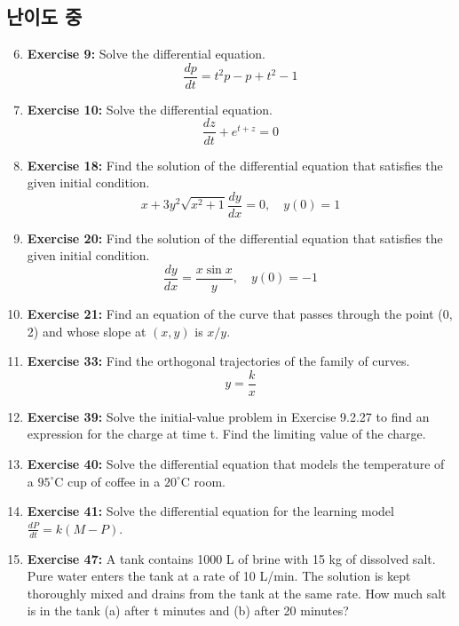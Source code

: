 \documentclass[12pt, a4paper]{article}
\begin{document}
\subsection*{난이도 중}
\begin{enumerate}
    \setcounter{enumi}{5} %
    \item \textbf{Exercise 9:} Solve the differential equation.
    \[ \frac{dp}{dt} = t^2p - p + t^2 - 1 \]

    \item \textbf{Exercise 10:} Solve the differential equation.
    \[ \frac{dz}{dt} + e^{t+z} = 0 \]

    \item \textbf{Exercise 18:} Find the solution of the differential equation that satisfies the given initial condition.
    \[ x + 3y^2\sqrt{x^2+1}\frac{dy}{dx} = 0, \quad y(0)=1 \]

    \item \textbf{Exercise 20:} Find the solution of the differential equation that satisfies the given initial condition.
    \[ \frac{dy}{dx} = \frac{x \sin x}{y}, \quad y(0)=-1 \]

    \item \textbf{Exercise 21:} Find an equation of the curve that passes through the point (0, 2) and whose slope at $(x,y)$ is $x/y$.

    \item \textbf{Exercise 33:} Find the orthogonal trajectories of the family of curves.
    \[ y = \frac{k}{x} \]

    \item \textbf{Exercise 39:} Solve the initial-value problem in Exercise 9.2.27 to find an expression for the charge at time t. Find the limiting value of the charge.

    \item \textbf{Exercise 40:} Solve the differential equation that models the temperature of a $95^{\circ}\text{C}$ cup of coffee in a $20^{\circ}\text{C}$ room.

    \item \textbf{Exercise 41:} Solve the differential equation for the learning model $\frac{dP}{dt}=k(M-P)$.

    \item \textbf{Exercise 47:} A tank contains 1000 L of brine with 15 kg of dissolved salt. Pure water enters the tank at a rate of 10 L/min. The solution is kept thoroughly mixed and drains from the tank at the same rate. How much salt is in the tank (a) after t minutes and (b) after 20 minutes?
\end{enumerate}
\end{document}
